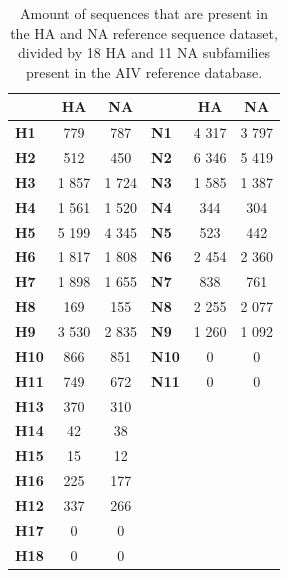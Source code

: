 \begin{table}[ht!]
	\centering
	\begin{tabular}{@{}lcclcc@{}}
	\toprule
				 & \textbf{HA}  & \textbf{NA}  &              & \textbf{HA}  & \textbf{NA}  \\ \midrule
	\textbf{H1}  & 779          & 787          & \textbf{N1}  & 4 317        & 3 797        \\
	\textbf{H2}  & 512          & 450          & \textbf{N2}  & 6 346        & 5 419        \\
	\textbf{H3}  & 1 857        & 1 724        & \textbf{N3}  & 1 585        & 1 387        \\
	\textbf{H4}  & 1 561        & 1 520        & \textbf{N4}  & 344          & 304          \\
	\textbf{H5}  & 5 199        & 4 345        & \textbf{N5}  & 523          & 442          \\
	\textbf{H6}  & 1 817        & 1 808        & \textbf{N6}  & 2 454        & 2 360        \\
	\textbf{H7}  & 1 898        & 1 655        & \textbf{N7}  & 838          & 761          \\
	\textbf{H8}  & 169          & 155          & \textbf{N8}  & 2 255        & 2 077        \\
	\textbf{H9}  & 3 530        & 2 835        & \textbf{N9}  & 1 260        & 1 092        \\
	\textbf{H10} & 866          & 851          & \textbf{N10} & 0            & 0            \\
	\textbf{H11} & 749          & 672          & \textbf{N11} & 0            & 0            \\
	\textbf{H13} & 370          & 310          &              &              &              \\
	\textbf{H14} & 42           & 38           &              &              &              \\
	\textbf{H15} & 15           & 12           &              &              &              \\
	\textbf{H16} & 225          & 177          &              &              &              \\
	\textbf{H12} & 337          & 266          &              &              &              \\
	\textbf{H17} & 0            & 0            &              &              &              \\
	\textbf{H18} & 0            & 0            &              &              &              \\ \bottomrule
	\end{tabular}
	\caption[AIV reference collection by HA and NA subfamilies.]{Amount of sequences that are present in the HA and NA reference sequence dataset, divided by 18 HA and 11 NA subfamilies present in the AIV reference database.}
\label{tab:apx-aiv-ref-subtypes}
\end{table}

